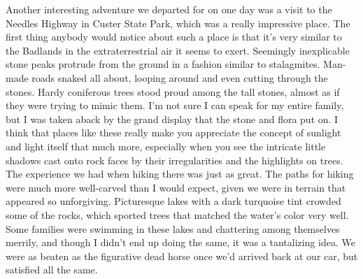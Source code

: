 \documentclass[12pt]{article}
\begin{document}
Another interesting adventure we departed for on one day was a visit to the Needles Highway in Custer State Park, which was a really impressive place.  The first thing anybody would notice about such a place is that it's very similar to the Badlands in the extraterrestrial air it seems to exert.  Seemingly inexplicable stone peaks protrude from the ground in a fashion similar to stalagmites.  Man-made roads snaked all about, looping around and even cutting through the stones.  Hardy coniferous trees stood proud among the tall stones, almost as if they were trying to mimic them.  I'm not sure I can speak for my entire family, but I was taken aback by the grand display that the stone and flora put on.  I think that places like these really make you appreciate the concept of sunlight and light itself that much more, especially when you see the intricate little shadows cast onto rock faces by their irregularities and the highlights on trees.  The experience we had when hiking there was just as great.  The paths for hiking were much more well-carved than I would expect, given we were in terrain that appeared so unforgiving.  Picturesque lakes with a dark turquoise tint crowded some of the rocks, which sported trees that matched the water's color very well.  Some families were swimming in these lakes and chattering among themselves merrily, and though I didn't end up doing the same, it was a tantalizing idea.  We were as beaten as the figurative dead horse once we'd arrived back at our car, but satisfied all the same.
\end{document}
